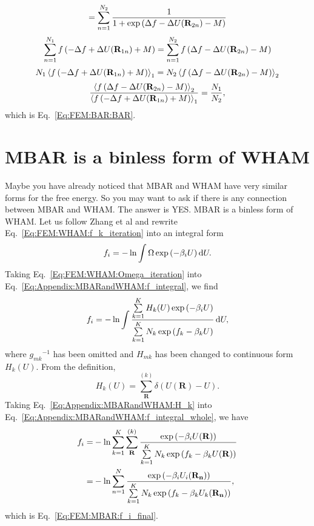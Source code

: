 \begin{appendices}
\begin{equation}
=\sum\limits_{n=1}^{N_2} \frac{1}{1+\exp{\left(\Delta f-\Delta U(\mathbf{R}_{2n})-M\right)}}\notag
\end{equation}
\begin{equation}
\sum\limits_{n=1}^{N_1}f\left(-\Delta f+\Delta U(\mathbf{R}_{1n})+M\right)=\sum\limits_{n=1}^{N_2} f\left(\Delta f-\Delta U(\mathbf{R}_{2n})-M\right)\notag
\end{equation}
\begin{equation}
N_1\left<f\left(-\Delta f+\Delta U(\mathbf{R}_{1n})+M\right)\right>_1=N_2\left<f\left(\Delta f-\Delta U(\mathbf{R}_{2n})-M\right)\right>_2\notag
\end{equation}
\begin{equation}
\frac{\left<f\left(\Delta f-\Delta U(\mathbf{R}_{2n})-M\right)\right>_2}{\left<f\left(-\Delta f+\Delta U(\mathbf{R}_{1n})+M\right)\right>_1}=\frac{N_1}{N_2},\notag
\end{equation}
which is Eq.~\ref{Eq:FEM:BAR:BAR}.

\chapter{MBAR is a binless form of WHAM\label{chapter:Appendix:MBARandWHAM}}
Maybe you have already noticed that MBAR and WHAM have very similar forms for the free energy. 
So you may want to ask if there is any connection between MBAR and WHAM. The answer is YES. 
MBAR is a binless form of WHAM.\cite{TanJCP2012} Let us follow Zhang et al\cite{ZhangMS2016} 
and rewrite Eq.~\ref{Eq:FEM:WHAM:f_k_iteration} into an integral form
\begin{equation}
f_i=-\ln\int\Omega\exp{(-\beta_iU)}\mathop{}\!\mathrm{d} U.
\label{Eq:Appendix:MBARandWHAM:f_integral}
\end{equation}
Taking Eq.~\ref{Eq:FEM:WHAM:Omega_iteration} into Eq.~\ref{Eq:Appendix:MBARandWHAM:f_integral}, we find
\begin{equation}
f_i=-\ln\int\frac{\sum\limits_{k=1}^{K}H_k(U)\exp{(-\beta_iU)}}{\sum\limits_{k=1}^{K}N_k\exp{(f_k-\beta_kU)}}\mathop{}\!\mathrm{d} U,
\label{Eq:Appendix:MBARandWHAM:f_integral_whole}
\end{equation}
where ${g_{mk}}^{-1}$ has been omitted and $H_{mk}$ has been changed to continuous form $H_k(U)$. From the definition,
\begin{equation}
H_k(U)=\sum\limits_{\mathbf{R}}^{(k)}\delta (U(\mathbf{R})-U).
\label{Eq:Appendix:MBARandWHAM:H_k}
\end{equation}
Taking Eq.~\ref{Eq:Appendix:MBARandWHAM:H_k} into Eq.~\ref{Eq:Appendix:MBARandWHAM:f_integral_whole}, we have
\begin{align}
f_i=&-\ln\sum\limits_{k=1}^{K}\sum\limits_{\mathbf{R}}^{(k)}\frac{\exp{(-\beta_iU(\mathbf{R}))}}{\sum\limits_{k=1}^{K}N_k\exp{(f_k-\beta_kU(\mathbf{R}))}}\notag\\
   =&-\ln\sum\limits_{n=1}^{N}\frac{\exp{(-\beta_iU_i(\mathbf{R_n}))}}{\sum\limits_{k=1}^{K}N_k\exp{(f_k-\beta_kU_k(\mathbf{R_n}))}},
\end{align}
which is Eq.~\ref{Eq:FEM:MBAR:f_i_final}.


\end{appendices}
